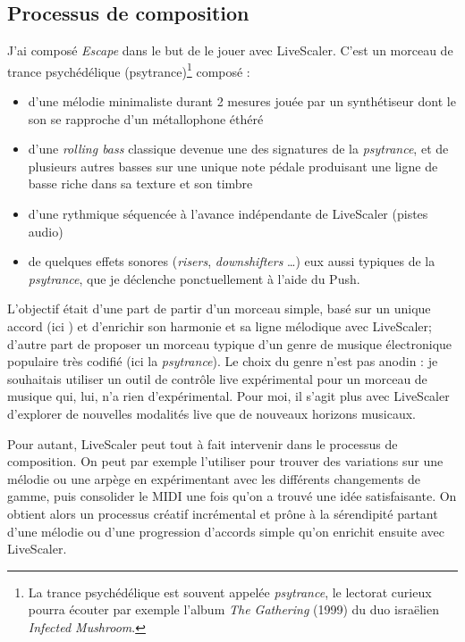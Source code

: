 \subsection{Processus de composition}

J'ai composé \emph{Escape} dans le but de le jouer avec LiveScaler. C'est un morceau de trance psychédélique (psytrance)\footnote{La trance psychédélique est souvent  appelée \emph{psytrance}, le lectorat curieux pourra écouter par exemple l'album \emph{The Gathering} (1999) du duo israëlien \emph{Infected Mushroom}.} composé  : 
\begin{itemize}
  \item d'une mélodie minimaliste durant 2 mesures jouée par un synthétiseur  dont le son se rapproche d'un métallophone éthéré
  \item d'une \emph{rolling bass} classique devenue une des signatures de la \emph{psytrance}, et de plusieurs autres basses sur une unique note pédale produisant une ligne de basse riche dans sa texture et son timbre
  \item d'une rythmique séquencée à l'avance indépendante de LiveScaler (pistes audio)
  \item de quelques effets sonores (\emph{risers}, \emph{downshifters} \dots) eux aussi typiques de la \emph{psytrance}, que je déclenche ponctuellement à l'aide du Push.
\end{itemize}

L'objectif était d'une part de partir d'un morceau simple, basé sur un unique accord (ici ) et d'enrichir son harmonie et sa ligne mélodique avec LiveScaler; d'autre part de proposer un morceau typique d'un genre de musique électronique populaire très codifié (ici la \emph{psytrance}). Le choix du genre n'est pas anodin :  je souhaitais utiliser un outil de contrôle live expérimental pour un morceau de musique qui, lui, n'a rien d'expérimental. Pour moi, il s'agit plus avec LiveScaler d'explorer de nouvelles modalités live que de nouveaux horizons musicaux.

Pour autant, LiveScaler peut tout à fait intervenir dans le processus de composition. On peut par exemple l'utiliser pour trouver des variations sur une mélodie ou une arpège en expérimentant avec les différents changements de gamme, puis consolider le MIDI une fois qu'on a trouvé une idée satisfaisante. On obtient alors un processus créatif incrémental et prône à la sérendipité partant d'une mélodie ou d'une progression d'accords simple qu'on enrichit ensuite avec LiveScaler.
